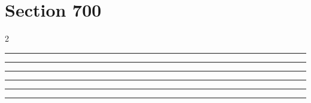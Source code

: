\documentclass[11pt,a4paper]{article}
\begin{document}
\section{Section 700}
\begin{multicols}{2}
\begin{swarmwrap}%
  \begin{minipage}[t]{2cm}
    \centering
    \textcolor{blue!30}{\rule{\linewidth}{9cm}}
  \end{minipage}%
\end{swarmwrap}%
\swarmwrapnext\lipsum[1]\lipsum[2]
\end{multicols}
\begin{swarmwrap}%
  \begin{minipage}[t]{3cm}
    \centering
    \textcolor{red!20}{\rule{\linewidth}{10cm}}
  \end{minipage}%
\end{swarmwrap}%
\swarmwrapnext\lipsum[1]\lipsum[2]\lipsum[3]\lipsum[4]\lipsum[5]\lipsum[6]
\begin{swarmwrap}%
  \begin{minipage}[t]{4cm}
    \centering
    \textcolor{red!20}{\rule{\linewidth}{2cm}}
  \end{minipage}%
\end{swarmwrap}%
\swarmwrapnext\lipsum[1]
\begin{swarmwrap}%
  \begin{minipage}[t]{5cm}
    \centering
    \textcolor{red!20}{\rule{\linewidth}{3cm}}
  \end{minipage}%
\end{swarmwrap}%
\swarmwrapnext\lipsum[1]\lipsum[2]
\begin{swarmwrap}%
  \begin{minipage}[t]{2cm}
    \centering
    \textcolor{red!20}{\rule{\linewidth}{4cm}}
  \end{minipage}%
\end{swarmwrap}%
\swarmwrapnext\lipsum[1]\lipsum[2]\lipsum[3]
\begin{swarmwrap}%
  \begin{minipage}[t]{3cm}
    \centering
    \textcolor{red!20}{\rule{\linewidth}{5cm}}
  \end{minipage}%
\end{swarmwrap}%
\swarmwrapnext\lipsum[1]\lipsum[2]\lipsum[3]\lipsum[4]
\end{document}
